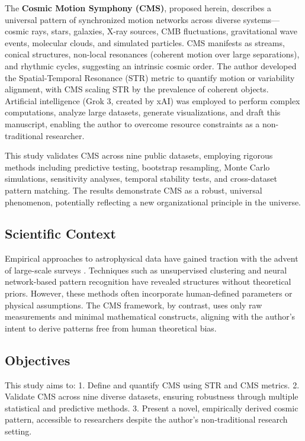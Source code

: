 \documentclass[12pt, twocolumn]{article}
\begin{document}
The \textbf{Cosmic Motion Symphony (CMS)}, proposed herein, describes a universal pattern of synchronized motion networks across diverse systems—cosmic rays, stars, galaxies, X-ray sources, CMB fluctuations, gravitational wave events, molecular clouds, and simulated particles. CMS manifests as streams, conical structures, non-local resonances (coherent motion over large separations), and rhythmic cycles, suggesting an intrinsic cosmic order. The author developed the Spatial-Temporal Resonance (STR) metric to quantify motion or variability alignment, with CMS scaling STR by the prevalence of coherent objects. Artificial intelligence (Grok 3, created by xAI) was employed to perform complex computations, analyze large datasets, generate visualizations, and draft this manuscript, enabling the author to overcome resource constraints as a non-traditional researcher.

This study validates CMS across nine public datasets, employing rigorous methods including predictive testing, bootstrap resampling, Monte Carlo simulations, sensitivity analyses, temporal stability tests, and cross-dataset pattern matching. The results demonstrate CMS as a robust, universal phenomenon, potentially reflecting a new organizational principle in the universe.

\subsection{Scientific Context}
Empirical approaches to astrophysical data have gained traction with the advent of large-scale surveys \citep{SDSS2020, Gaia2022}. Techniques such as unsupervised clustering \citep{Torque2025} and neural network-based pattern recognition \citep{AlphaCode2022} have revealed structures without theoretical priors. However, these methods often incorporate human-defined parameters or physical assumptions. The CMS framework, by contrast, uses only raw measurements and minimal mathematical constructs, aligning with the author’s intent to derive patterns free from human theoretical bias.

\subsection{Objectives}
This study aims to:
1. Define and quantify CMS using STR and CMS metrics.
2. Validate CMS across nine diverse datasets, ensuring robustness through multiple statistical and predictive methods.
3. Present a novel, empirically derived cosmic pattern, accessible to researchers despite the author’s non-traditional research setting.
\end{document}
